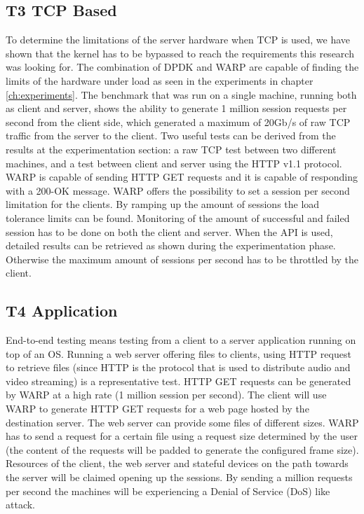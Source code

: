\subsection{T3 TCP Based}
To determine the limitations of the server hardware when TCP is used, we have shown that the kernel has to be bypassed to reach the requirements this research was looking for. 
The combination of DPDK and WARP are capable of finding the limits of the hardware under load as seen in the experiments in chapter \ref{ch:experiments}. The benchmark that was run on a single machine, running both as client and server, shows the ability to generate 1 million session requests per second from the client side, which generated a maximum of 20Gb/s of raw TCP traffic from the server to the client. 
Two useful tests can be derived from the results at the experimentation section: a raw TCP test between two different machines, and a test between client and server using the HTTP v1.1 protocol. 
WARP is capable of sending  HTTP GET requests and it is capable of responding with a 200-OK message.
WARP offers the possibility to set a session per second limitation for the clients. By ramping up the amount of sessions the load tolerance limits can be found. 
Monitoring of the amount of successful and failed session has to be done on both the client and server. When the API is used, detailed results can be retrieved as shown during the experimentation phase. Otherwise the maximum amount of sessions per second has to be throttled by the client.    

\subsection{T4 Application}
End-to-end testing means testing from a client to a server application running on top of an OS.
Running a web server offering files to clients, using HTTP request to retrieve files (since HTTP is the protocol that is used to distribute audio and video streaming) is a representative test.
HTTP GET requests can be generated by WARP at a high rate (1 million session per second). 
The client will use WARP to generate HTTP GET requests for a web page hosted by the destination server. The web server can provide some files of different sizes. WARP has to send a request for a certain file using a request size determined by the user (the content of the requests will be padded to generate the configured frame size).  Resources of the client, the web server and stateful devices on the path towards the server will be claimed opening up the sessions. By sending a million requests per second the machines will be experiencing a Denial of Service (DoS) like attack.

